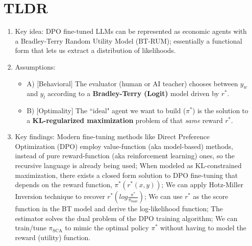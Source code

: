 \documentclass[11pt]{article}
\theoremstyle{plain}
\theoremstyle{definition}
\theoremstyle{remark}
\newcommand{\1}{\mathbf{1}}
\begin{document}
\clearpage

\tableofcontents
\clearpage


\section{TLDR}\label{sec:TLDR}

\begin{enumerate}
    \item Key idea: DPO fine-tuned LLMs can be represented as economic agents with a Bradley-Terry Random Utility Model (BT-RUM); essentially a functional form that lets us extract a distribution of likelihoods.

    \item Assumptions:
        \begin{itemize}
            \item A) [Behavioral] The evaluator (human or AI teacher) chooses between $y_w$ and $y_l$ according to a \textbf{Bradley-Terry (Logit)} model driven by $r^*$.
            \item B) [Optimality] The ``ideal" agent we want to build ($\pi^*$) is the solution to a \textbf{KL-regularized maximization} problem of that \textit{same} reward $r^*$.
        \end{itemize}

    \item Key findings: Modern fine-tuning methods like Direct Preference Optimization (DPO) employ value-function (aka model-based) methods, instead of pure reward-function (aka reinforcement learning) ones, so the recursive language is already being used; When modeled as KL-constrained maximization, there exists a closed form solution to DPO fine-tuning that depends on the reward function, $\pi^*(r^*(x,y))$; We can apply Hotz-Miller Inversion technique to recover $r^*(log \frac{\pi^*}{\pi_{\text{base}}})$; We can use $r^*$ as the score function in the BT model and derive the log-likelihood function; The estimator solves the dual problem of the DPO training algorithm; We can train/tune $\pi_{\text{SCA}}$ to mimic the optimal policy $\pi^*$ without having to model the reward (utility) function. 


\end{enumerate}
\end{document}
